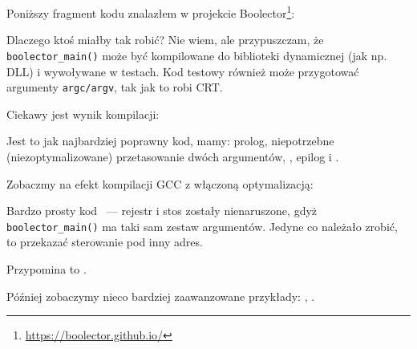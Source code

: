 \label{Boolector}

Poniższy fragment kodu znalazłem w projekcie Boolector\footnote{\url{https://boolector.github.io/}}:



Dlaczego ktoś miałby tak robić? Nie wiem, ale przypuszczam, że \verb|boolector_main()| może być kompilowane do biblioteki dynamicznej (jak np. DLL) i wywoływane w testach. Kod testowy również może przygotować argumenty \verb|argc/argv|, tak jak to robi \ac{CRT}.

Ciekawy jest wynik kompilacji:



Jest to jak najbardziej poprawny kod, mamy: prolog, niepotrzebne (niezoptymalizowane) przetasowanie dwóch argumentów, , epilog i .

Zobaczmy na efekt kompilacji GCC z włączoną optymalizacją:



Bardzo prosty kod ~--- rejestr i stos zostały nienaruszone, gdyż \verb|boolector_main()| ma taki sam zestaw argumentów. Jedyne co należało zrobić, to przekazać sterowanie pod inny adres.

Przypomina to .

Później zobaczymy nieco bardziej zaawanzowane przykłady: , .

